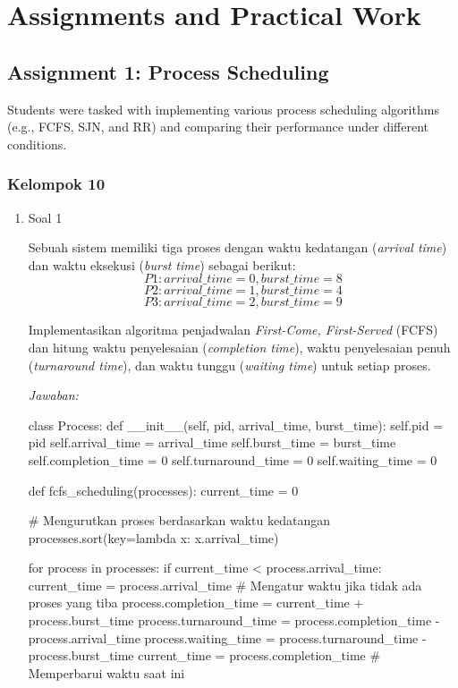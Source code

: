 \documentclass[12pt]{article}
\begin{document}
\section{Assignments and Practical Work}
\subsection{Assignment 1: Process Scheduling}
Students were tasked with implementing various process scheduling algorithms (e.g., FCFS, SJN, and RR) and comparing their performance under different conditions.
\subsubsection{Kelompok 10}

\begin{enumerate}
    \item Soal 1

Sebuah sistem memiliki tiga proses dengan waktu kedatangan (\textit{arrival time}) dan waktu eksekusi (\textit{burst time}) sebagai berikut:  
\[P1: arrival\_time = 0, burst\_time = 8\]  
\[P2: arrival\_time = 1, burst\_time = 4\]  
\[P3: arrival\_time = 2, burst\_time = 9\]  

Implementasikan algoritma penjadwalan \textit{First-Come, First-Served} (FCFS) dan hitung waktu penyelesaian (\textit{completion time}), waktu penyelesaian penuh (\textit{turnaround time}), dan waktu tunggu (\textit{waiting time}) untuk setiap proses.

\textit{Jawaban:}
\begin{python}
class Process:
    def __init__(self, pid, arrival_time, burst_time):
        self.pid = pid
        self.arrival_time = arrival_time
        self.burst_time = burst_time
        self.completion_time = 0
        self.turnaround_time = 0
        self.waiting_time = 0

def fcfs_scheduling(processes):
    current_time = 0
    
    # Mengurutkan proses berdasarkan waktu kedatangan
    processes.sort(key=lambda x: x.arrival_time)
    
    for process in processes:
        if current_time < process.arrival_time:
            current_time = process.arrival_time  # Mengatur waktu jika tidak ada proses yang tiba
        process.completion_time = current_time + process.burst_time
        process.turnaround_time = process.completion_time - process.arrival_time
        process.waiting_time = process.turnaround_time - process.burst_time
        current_time = process.completion_time  # Memperbarui waktu saat ini


\end{python}
\end{enumerate}
\end{document}

